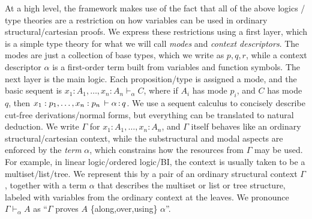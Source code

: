 \documentclass[a4paper,USenglish,numberwithinsect]{lipics-v2016}
\newcommand\seq[3]{\ensuremath{#1 \vdash_{#2} #3}}
\renewcommand{\oftp}[3]{\ensuremath{#1 \, \vdash #2 \, \dcd{:} \, #3}}
\begin{document}
At a high level, the framework makes use of the fact that all of the
above logics / type theories are a restriction on how variables can be
used in ordinary structural/cartesian proofs.  We express these
restrictions using a first layer, which is a simple type theory for what
we will call \emph{modes} and \emph{context descriptors}.  The modes are
just a collection of base types, which we write as $p,q,r$, while a
context descriptor $\alpha$ is a first-order term built from variables
and function symbols.  The next layer is the main logic.  Each
proposition/type is assigned a mode, and the basic sequent is \seq{x_1 :
  A_1, \ldots, x_n : A_n}{\alpha}{C}, where if $A_i$ has mode $p_i$, and
$C$ has mode $q$, then $\oftp{x_1 : p_1,\ldots, x_n : p_n}{\alpha}{q}$.
We use a sequent calculus to concisely describe cut-free
derivations/normal forms, but everything can be translated to natural
deduction.  We write ${\Gamma}$ for $x_1 : A_1, \ldots, x_n : A_n$, and
$\Gamma$ itself behaves like an ordinary structural/cartesian context,
while the substructural and modal aspects are enforced by the
\emph{term} $\alpha$, which constrains how the resources from $\Gamma$
may be used.  For example, in linear logic/ordered logic/BI, the context
is usually taken to be a multiset/list/tree.  We represent this by a
pair of an ordinary structural context $\Gamma$, together with a term
$\alpha$ that describes the multiset or list or tree structure, labeled
with variables from the ordinary context at the leaves.  We pronounce
\seq{\Gamma}{\alpha}{A} as ``$\Gamma$ proves $A$ \{along,over,using\}
$\alpha$''.
\end{document}
